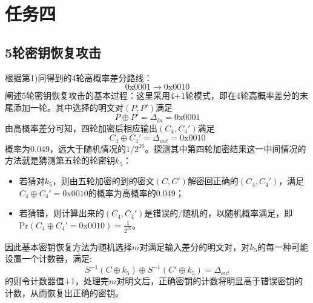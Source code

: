 \section{任务四}
\subsection{5轮密钥恢复攻击}
根据第1)问得到的4轮高概率差分路线：
$$
\text{0x}0001\longrightarrow\text{0x}0010
$$
阐述5轮密钥恢复攻击的基本过程：这里采用4+1轮模式，即在4轮高概率差分的末尾添加一轮。其中选择的明文对$(P,P')$满足
$$
P \oplus P' = \Delta_{in} = \text{0x}0001
$$
由高概率差分可知，四轮加密后相应输出$(C_4,C_4')$满足
$$
C_4 \oplus C_4' = \Delta_{out} = \text{0x}0010
$$
概率为0.049，远大于随机情况的$1/2^{16}$。探测其中第四轮加密结果这一中间情况的方法就是猜测第五轮的轮密钥$k_5$：
\begin{itemize}
    \item 若猜对$k_5$，则由五轮加密的到的密文$(C,C')$解密回正确的$(C_4,C_4')$，满足$C_4 \oplus C_4' = \text{0x}0010$的概率为高概率的0.049；
    \item 若猜错，则计算出来的$(C_4,C_4')$是错误的/随机的，以随机概率满足，即$\text{Pr}(C_4 \oplus C_4' = \text{0x}0010) = \frac{1}{2^{16}}$。
\end{itemize}
因此基本密钥恢复方法为随机选择$m$对满足输入差分的明文对，对$k_5$的每一种可能设置一个计数器，满足:
$$
S^{-1}(C\oplus k_5) \oplus S^{-1}(C'\oplus k_5) = \Delta_{out}
$$
的则令计数器值+1，处理完$m$对明文后，正确密钥的计数将明显高于错误密钥的计数，从而恢复出正确的密钥。

